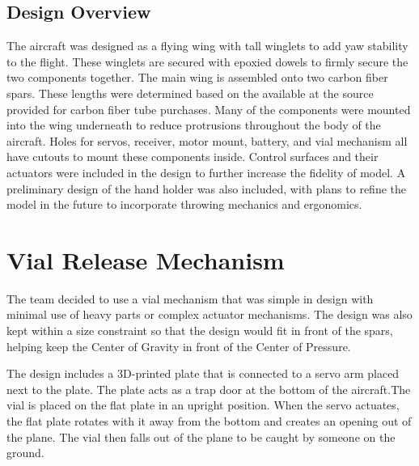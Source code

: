     \subsection{Design Overview}
    
        The aircraft was designed as a flying wing with tall winglets to add yaw stability to the flight. These winglets are secured with epoxied dowels to firmly secure the two components together. The main wing is assembled onto two carbon fiber spars. These lengths were determined based on the available at the source provided for carbon fiber tube purchases. Many of the components were mounted into the wing underneath to reduce protrusions throughout the body of the aircraft. Holes for servos, receiver, motor mount, battery, and vial mechanism all have cutouts to mount these components inside. Control surfaces and their actuators were included in the design to further increase the fidelity of model. A preliminary design of the hand holder was also included, with plans to refine the model in the future to incorporate throwing mechanics and ergonomics.

\section{Vial Release Mechanism}

        The team decided to use a vial mechanism that was simple in design with minimal use of heavy parts or complex actuator mechanisms. The design was also kept within a size constraint so that the design would fit in front of the spars, helping keep the Center of Gravity in front of the Center of Pressure. 
        
        The design includes a 3D-printed plate that is connected to a servo arm placed next to the plate. The plate acts as a trap door at the bottom of the aircraft.The vial is placed on the flat plate in an upright position. When the servo actuates, the flat plate rotates with it away from the bottom and creates an opening out of the plane. The vial then falls out of the plane to be caught by someone on the ground.
        
